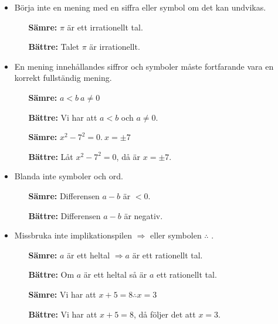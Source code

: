 \documentclass[titlepage]{article}
\begin{document}
\begin{itemize}
    \item Börja inte en mening med en siffra eller symbol om det kan undvikas.
        \begin{itemize}[leftmargin=20mm]
            \item[\textbf{Sämre:}] $\pi$ är ett irrationellt tal.
            \item[\textbf{Bättre:}] Talet $\pi$ är irrationellt. 
        \end{itemize}
    \item En mening innehållandes siffror och symboler måste fortfarande vara en korrekt fullständig mening.
        \begin{itemize}[leftmargin=20mm]
            \item[\textbf{Sämre:}] $a < b \: a \neq 0$
            \item[\textbf{Bättre:}] Vi har att $a<b$ och $a \neq 0$.
            \vspace{2mm}
            \item[\textbf{Sämre:}] $x^2 - 7^2 = 0.\: x = \pm 7$
            \item[\textbf{Bättre:}] Låt $x^2 - 7^2 = 0$, då är $x = \pm 7.$
        \end{itemize}
    \item Blanda inte symboler och ord.
        \begin{itemize}[leftmargin=20mm]
            \item[\textbf{Sämre:}] Differensen $a-b$ är $<0$.
            \item[\textbf{Bättre:}] Differensen $a-b$ är negativ.
        \end{itemize}
    \item Missbruka inte implikationspilen $\Rightarrow$ eller symbolen $\therefore$ .
        \begin{itemize}[leftmargin=20mm]
            \item[\textbf{Sämre:}] $a$ är ett heltal $\Rightarrow a$ är ett rationellt tal.
            \item[\textbf{Bättre:}] Om $a$ är ett heltal så är $a$ ett rationellt tal.
            \vspace{2mm}
            \item[\textbf{Sämre:}] Vi har att $x+5=8 \therefore x = 3$
            \item[\textbf{Bättre:}]  Vi har att $x+5=8$, då följer det att $x = 3$.
        \end{itemize}
\end{itemize}
\end{document}
